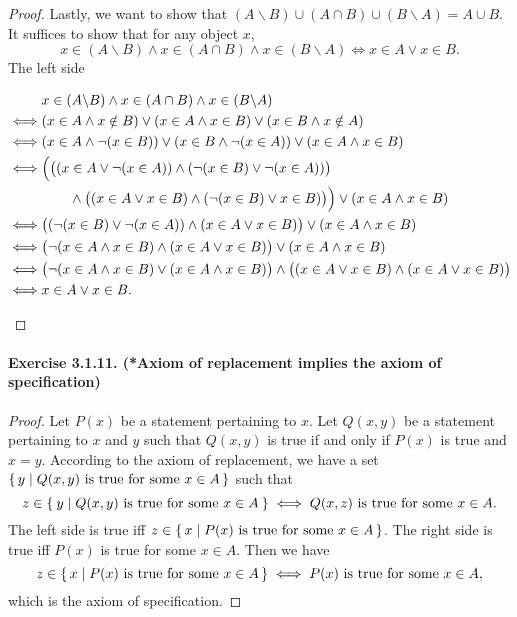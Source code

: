 \begin{proof}
    Lastly, we want to show that $(A\backslash B)\cup (A\cap B) \cup (B\backslash A) = A\cup B$. It suffices to show that for any object $x$, \[x\in (A\backslash B) \land x \in (A\cap B) \land x \in (B\backslash A) \iff x \in A \lor x\in B.\] The left side
    \begin{allowdisplaybreaks}
    \begin{align*}
        & x\in (A\backslash B) \land x \in (A\cap B) \land x \in (B\backslash A) 
        \\\iff& (x\in A \land x \notin B) \lor (x\in A \land x\in B) \lor (x\in B \land x\notin A)
        \\\iff& (x \in A \land \lnot (x \in B)) \lor (x \in B \land \lnot (x \in A)) \lor (x\in A \land x\in B)
        \\\iff& \Big( \big( (x \in A \lor \lnot (x \in A)) \land (\lnot (x \in B) \lor \lnot (x \in A)) \big) 
            \\&\qquad \land \big( (x \in A \lor x \in B) \land (\lnot (x \in B) \lor x \in B) \big) \Big) \lor (x\in A \land x\in B)
        \\\iff& \big((\lnot (x \in B) \lor \lnot (x \in A)) \land (x \in A \lor x \in B)\big) \lor (x\in A \land x\in B)
        \\\iff& \big( \lnot ( x \in A \land x \in B) \land (x \in A \lor x \in B)\big) \lor (x\in A \land x\in B)
        \\\iff& \big( \lnot (x \in A \land x \in B) \lor (x \in A \land x \in B) \big) \land \big( (x \in A \lor x \in B) \land (x \in A \lor x \in B) \big)
        \\\iff& x \in A \lor x \in B. \qedhere
    \end{align*}
    \end{allowdisplaybreaks}
\end{proof}

\paragraph{Exercise 3.1.11. (*Axiom of replacement implies the axiom of specification)}
\begin{proof}
    Let $P(x)$ be a statement pertaining to $x$. Let $Q(x,y)$ be a statement pertaining to $x$ and $y$ such that $Q(x,y)$ is true if and only if $P(x)$ is true and $x=y$. According to the axiom of replacement, we have a set $\set{y | Q(x,y)\text{ is true for some }x \in A}$ such that \[z \in \Set{y | Q(x,y)\text{ is true for some }x \in A} \iff Q(x,z)\text{ is true for some }x \in A.\] The left side is true iff $z\in \set{x | P(x)\text{ is true for some }x \in A}$. The right side is true iff $P(x)$ is true for some $x \in A$. Then we have \[z\in \set{x | P(x)\text{ is true for some }x \in A} \iff P(x)\text{ is true for some }x \in A,\] which is the axiom of specification.
\end{proof}